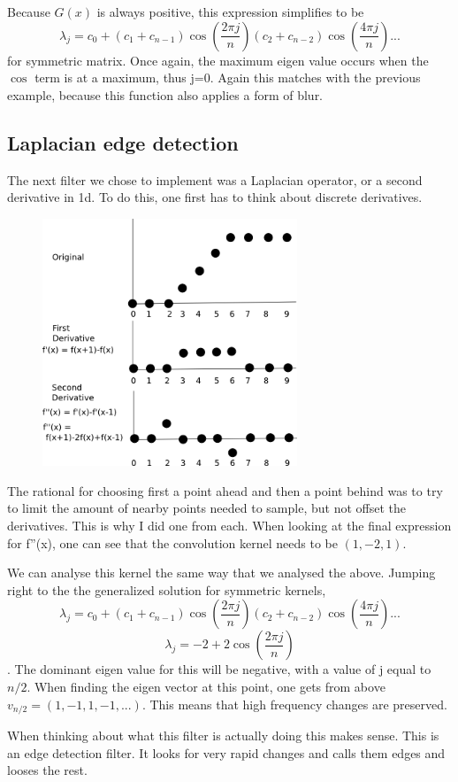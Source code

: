 \documentclass[11pt]{article}
\begin{document}
Because $G(x)$ is always positive, this expression simplifies to be $$\lambda_j = c_0+(c_{1}+c_{n-1})\cos(\dfrac{2\pi j}{n})(c_{2}+c_{n-2})\cos(\dfrac{4\pi j}{n}) ...$$ for symmetric matrix. Once again, the maximum eigen value occurs when the $\cos$ term is at a maximum, thus j=0. Again this matches with the previous example, because this function also applies a form of blur.   

\subsection{Laplacian edge detection}
The next filter we chose to implement was a Laplacian operator, or a second derivative in 1d. To do this, one first has to think about discrete derivatives.
\begin{figure}[htp]
\includegraphics[width=3in]{discreteLaplacian.png}
\label{}
\end{figure}
The rational for choosing first a point ahead and then a point behind was to try to limit the amount of nearby points needed to sample, but not offset the derivatives. This is why I did one from each. When looking at the final expression for f''(x), one can see that the convolution kernel needs to be $(1,-2,1)$.

We can analyse this kernel the same way that we analysed the above. Jumping right to the the generalized solution for symmetric kernels,$$\lambda_j = c_0+(c_{1}+c_{n-1})\cos(\dfrac{2\pi j}{n})(c_{2}+c_{n-2})\cos(\dfrac{4\pi j}{n}) ...$$ 
$$ \lambda_j = -2 + 2\cos(\dfrac{2\pi j}{n}) $$. The dominant eigen value for this will be negative, with a value of j equal to $n/2$. When finding the eigen vector at this point, one gets from above $v_{n/2} = (1,-1,1,-1, ...)$. This means that high frequency changes are preserved. 

When thinking about what this filter is actually doing this makes sense. This is an edge detection filter. It looks for very rapid changes and calls them edges and looses the rest.
\end{document}
